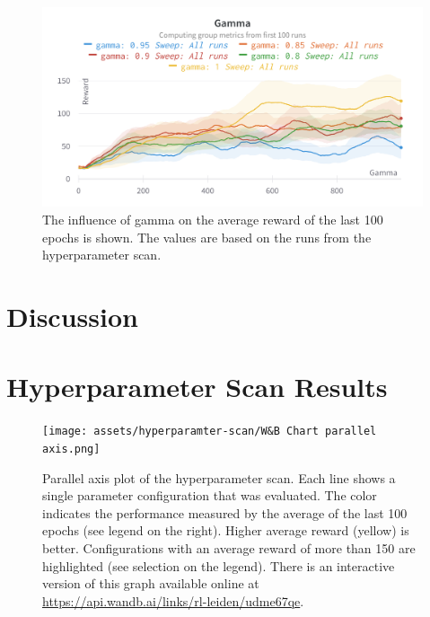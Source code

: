 \documentclass{article}
\begin{document}
\begin{figure}[ht!]
   \centering
   \includegraphics[width=\columnwidth]{assets/hyperparamter-scan/W&B Chart Gamma.png}
   \caption{The influence of gamma on the average reward of the last 100 epochs is shown. The values are based on the runs from the hyperparameter scan.
   }
   \label{fig:hyperparameter_scan_isolated_gamma}
\end{figure}

\section{Discussion}
\label{sec:discussion}




\nocite{DBLP:books/sp/Plaat22}





\appendix
\section{Hyperparameter Scan Results}
\label{sec:hyperparameter-scan-results}

\begin{figure}[ht!]
   \centering
   \texttt{[image: assets/hyperparamter-scan/W\&B Chart parallel axis.png]}
   \caption{Parallel axis plot of the hyperparameter scan. 
      Each line shows a single parameter configuration that was evaluated. 
      The color indicates the performance measured by the average of the last 100 epochs (see legend on the right). 
      Higher average reward (yellow) is better.
      Configurations with an average reward of more than 150 are highlighted (see selection on the legend).
      There is an interactive version of this graph available online at \url{https://api.wandb.ai/links/rl-leiden/udme67qe}.
   }
   \label{fig_hyperparameter_scan_parallel_axis}
\end{figure}
\end{document}
